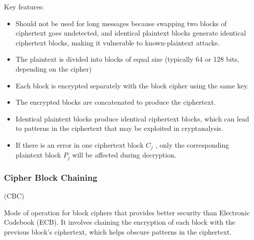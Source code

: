 Key features:
\begin{itemize}
    \item Should not be used for long messages because swapping two blocks of ciphertext goes undetected, and identical plaintext blocks generate identical ciphertext blocks, making it vulnerable to known-plaintext attacks.
    \item The plaintext is divided into blocks of equal size (typically 64 or 128 bits, depending on the cipher)
    \item Each block is encrypted separately with the block cipher using the same key.
    \item The encrypted blocks are concatenated to produce the ciphertext.
    \item Identical plaintext blocks produce identical ciphertext blocks, which can lead to patterns in the ciphertext that may be exploited in cryptanalysis.
    \item If there is an error in one ciphertext block  $C_j$ , only the corresponding plaintext block  $P_j$  will be affected during decryption.
\end{itemize}

\clearpage
\subsubsection{Cipher Block Chaining}

\begin{center}
    (CBC)
\end{center}
Mode of operation for block ciphers that provides better security than Electronic Codebook (ECB). It involves chaining the encryption of each block with the previous block’s ciphertext, which helps obscure patterns in the ciphertext.



